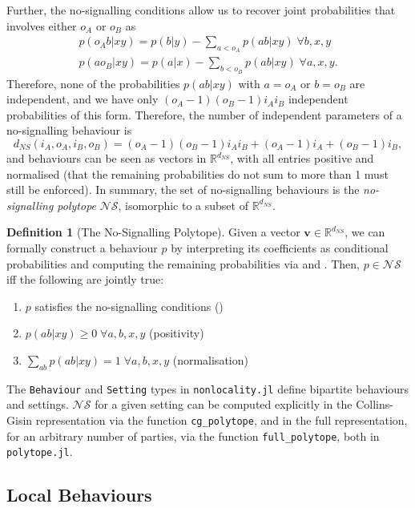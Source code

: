 \documentclass[10pt, a4paper]{article}
\numberwithin{equation}{section} %
\newcounter{stmt} %
\theoremstyle{definition}
\newtheorem{defn}[stmt]{Definition}
\theoremstyle{plain}
\newcommand{\?}{\mathrel{?}} %
\newcommand{\R}{\mathbb{R}} %
\newcommand{\cvec}[1]{\boldsymbol{\mathbf{#1}}}    %
\newcommand{\NSs}{\mathcal{NS}}
\begin{document}
    Further, the no-signalling conditions allow us to recover joint probabilities that involves either \(o_A\) or \(o_B\) as
    \begin{gather}
      p(o_A b|xy) = p(b|y) - \sum_{a < o_A} p(ab|xy)\;\forall b,x,y\label{eqn:cgtofullA} \\
      p(ao_B|xy) = p(a|x) - \sum_{b < o_B} p(ab|xy)\;\forall a,x,y.\label{eqn:cgtofullB}
    \end{gather}
    Therefore, none of the probabilities \(p(ab|xy)\) with \(a = o_A\) or \(b = o_B\) are independent, and we have only \((o_A-1)(o_B-1){i_A}{i_B}\) independent probabilities of this form. Therefore, the number of independent parameters of a no-signalling behaviour is
    \[ d_{NS}(i_A, o_A, i_B, o_B) = (o_A-1)(o_B-1){i_A}{i_B} + (o_A-1)i_A + (o_B-1)i_B, \]
    and behaviours can be seen as vectors in \(\R^{d_{NS}}\), with all entries positive and normalised (that the remaining probabilities do not sum to more than 1 must still be enforced). In summary, the set of no-signalling behaviours is the \emph{no-signalling polytope} \(\NSs\), isomorphic to a subset of \(\R^{d_{NS}}\).
    \begin{defn}[The No-Signalling Polytope]
      Given a vector \(\cvec{v} \in \R^{d_{NS}}\), we can formally construct a behaviour \(p\) by interpreting its coefficients as conditional probabilities and computing the remaining probabilities via  and . Then, \(p \in \NSs\) iff the following are jointly true:
      \begin{enumerate}
        \item \(p\) satisfies the no-signalling conditions ()
        \item \(p(ab|xy) \geq 0\;\forall a,b,x,y\) (positivity)
        \item \(\sum_{ab} p(ab|xy) = 1\;\forall a,b,x,y\) (normalisation)
      \end{enumerate}
    \end{defn}

    The \verb`Behaviour` and \verb`Setting` types in \verb`nonlocality.jl` define bipartite behaviours and settings. \(\NSs\) for a given setting can be computed explicitly in the Collins-Gisin representation via the function \verb`cg_polytope`, and in the full representation, for an arbitrary number of parties, via the function \verb`full_polytope`, both in \verb`polytope.jl`.

    \subsection{Local Behaviours}
\end{document}
